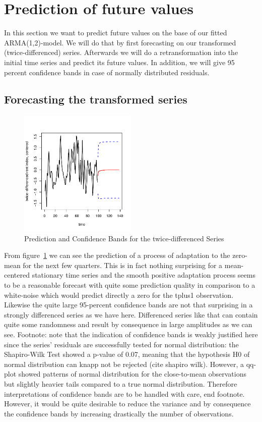 \documentclass[11pt,a4paper]{article}
\begin{document}
\section{Prediction of future values}
In this section we want to predict future values on the base of our fitted ARMA(1,2)-model. We will do that by first forecasting on our transformed (twice-differenced) series. Afterwards we will do a retransformation into the initial time series and predict its future values. In addition, we will give 95 percent confidence bands in case of normally distributed residuals.
\subsection{Forecasting the transformed series}

\begin{figure}[!ht]
\centering
\includegraphics[angle=0,
width=0.5\textwidth]{pred_transformed_series}
\caption{Prediction and Confidence Bands for the twice-differenced Series
\label{fig:pred_transformed_series}}
\end{figure}


From figure~\ref{fig:pred_transformed_series} we can see the prediction of a process of adaptation to the zero-mean for the next few quarters. This is in fact nothing surprising for a mean-centered stationary time series and the smooth positive adaptation process seems to be a reasonable forecast with quite some prediction quality in comparison to a white-noise which would predict directly a zero for the tplus1 observation. 
Likewise the quite large 95-percent confidence bands are not that surprising in a strongly differenced series as we have here. Differenced series like that can contain quite some randomness and result by consequence in large amplitudes as we can see. Footnote: note that the indication of confidence bands is weakly justified here since the series’ residuals are successfully tested for normal distribution: the Shapiro-Wilk Test showed a p-value of 0.07, meaning that the hypothesis H0 of normal distribution can knapp not be rejected (cite shapiro wilk). However, a qq-plot showed patterns of normal distribution for the close-to-mean observations but slightly heavier tails compared to a true normal distribution. Therefore interpretations of confidence bands are to be handled with care, end footnote.
However, it would be quite desirable to reduce the variance and by consequence  the confidence bands by increasing drastically the number of observations.
\end{document}
